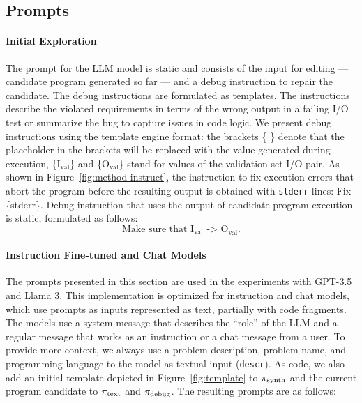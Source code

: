 \newpage\subsection{Prompts}
\label{sec:seidr-prompts}

\paragraph{Initial Exploration}
\label{sec:seidr-prompt-strategies}

The prompt for the LLM model is static and consists of the input for editing --- candidate program generated so far --- and a debug instruction to repair the candidate. 
The debug instructions are formulated as templates. The instructions describe the violated requirements in terms of the wrong output in a failing I/O test or summarize the bug to capture issues in code logic.
We present debug instructions using the template engine format: the brackets \{ \} denote that the placeholder in the brackets will be replaced with the value generated during execution, \{I$_{\text{val}}$\} and \{O$_{\text{val}}$\} stand for values of the validation set I/O pair. As shown in Figure~\ref{fig:method-instruct}, the instruction to fix execution errors that abort the program before the resulting output is obtained with \texttt{stderr} lines: Fix \{stderr\}. Debug instruction that uses the output of candidate program execution is static, formulated as follows: 
\begin{equation}\label{seidr:prompt-0} 
    \text{Make sure that I}_{\text{val}} \text{ -> O}_{\text{val}}. \tag{S0}
\end{equation}


\paragraph{Instruction Fine-tuned and Chat Models}
\label{sec:seidr-ollama-prompts}

The prompts presented in this section are used in the experiments with GPT-3.5 and Llama 3.
This implementation is optimized for instruction and chat models, which use prompts as inputs represented as text, partially with code fragments.
The models use a system message that describes the ``role'' of the LLM and a regular message that works as an instruction or a chat message from a user.
To provide more context, we always use a problem description, problem name, and programming language to the model as textual input (\texttt{descr}). 
As code, we also add an initial template depicted in Figure~\ref{fig:template} to $ \pi_\text{synth} $ and the current program candidate to $ \pi_\text{text} $ and $ \pi_\text{debug} $. The resulting prompts are as follows:

